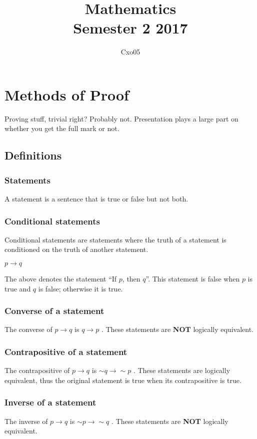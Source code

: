 \documentclass[10pt,a4paper]{article}
\begin{document}
\title{
Mathematics \\
\large Semester 2 2017
}
\author{Cxo05}

\maketitle
\section{Methods of Proof}
Proving stuff, trivial right? Probably not. Presentation plays a large part on whether you get the full mark or not.

\subsection{Definitions}
\subsubsection{Statements}
A statement is a sentence that is true or false but not both.
\subsubsection{Conditional statements}
Conditional statements are statements where the truth of a statement is conditioned on the truth of another statement.
\begin{center}
$p \rightarrow q$
\end{center}
The above denotes the statement ``If $p$, then $q$''. This statement is false when $p$ is true and $q$ is false; otherwise it is true.
\subsubsection{Converse of a statement}
The converse of $p \rightarrow q$ is $q
\rightarrow p$ . These statements are \textbf{NOT} logically equivalent. 
\subsubsection{Contrapositive of a statement}
The contrapositive of $p \rightarrow q$ is $\sim q \rightarrow \sim p$ . These statements are logically equivalent, thus the original statement is true when its contrapositive is true.
\subsubsection{Inverse of a statement}
The inverse of $p \rightarrow q$ is $\sim p \rightarrow \sim q$ . These statements are \textbf{NOT} logically equivalent. 
\end{document}

